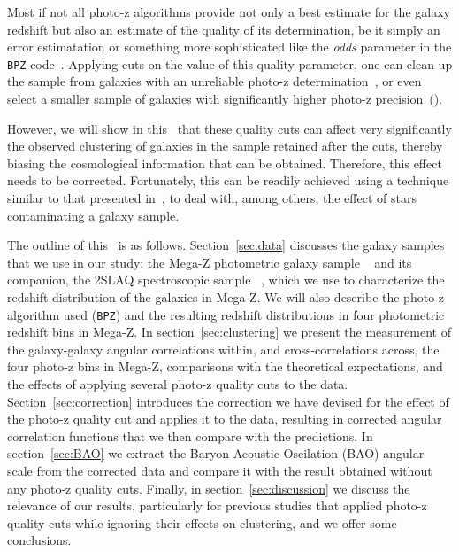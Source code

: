 Most if not all photo-z algorithms provide not only a best estimate for the galaxy redshift but also an estimate of the quality of its determination, be it simply an error estimatation or something more sophisticated like the {\it odds} parameter in the {\tt BPZ} code~\citep{Benitez2000}. Applying cuts on the value of this quality parameter, one can clean up the sample from galaxies with an unreliable photo-z determination~\citep{Benitez2000}, or even select a smaller sample of galaxies with significantly higher photo-z precision~(\paperpau).

However, we will show in this \doctype\ that these quality cuts can affect very significantly the observed clustering of galaxies in the sample retained after the cuts, thereby biasing the cosmological information that can be obtained. Therefore, this effect needs to be corrected. Fortunately, this can be readily achieved using a technique similar to that presented in~\citet{Ho2012}, to deal with, among others, the effect of stars contaminating a galaxy sample. 

The outline of this \doctype\ is as follows. Section~\ref{sec:data} discusses the galaxy samples that we use in our study: the Mega-Z photometric galaxy sample ~\citep{Collister2007} and its companion, the 2SLAQ spectroscopic sample ~\citep{Cannon2006}, which we use to characterize the redshift distribution of the galaxies in Mega-Z. We will also describe the photo-z algorithm used ({\tt BPZ}) and the resulting redshift distributions in four photometric redshift bins in Mega-Z. In section~\ref{sec:clustering} we present the measurement of the galaxy-galaxy angular correlations within, and cross-correlations across, the four photo-z bins in Mega-Z, comparisons with the theoretical expectations, and the effects of applying several photo-z quality cuts to the data. Section~\ref{sec:correction} introduces the correction we have devised for the effect of the photo-z quality cut and applies it to the data, resulting in corrected angular correlation functions that we then compare with the predictions. In section~\ref{sec:BAO} we extract the Baryon Acoustic Oscilation (BAO) angular scale from the corrected data and compare it with the result obtained without any photo-z quality cuts. Finally, in section~\ref{sec:discussion} we discuss the relevance of our results, particularly for previous studies that applied photo-z quality cuts while ignoring their effects on clustering, and we offer some conclusions.
